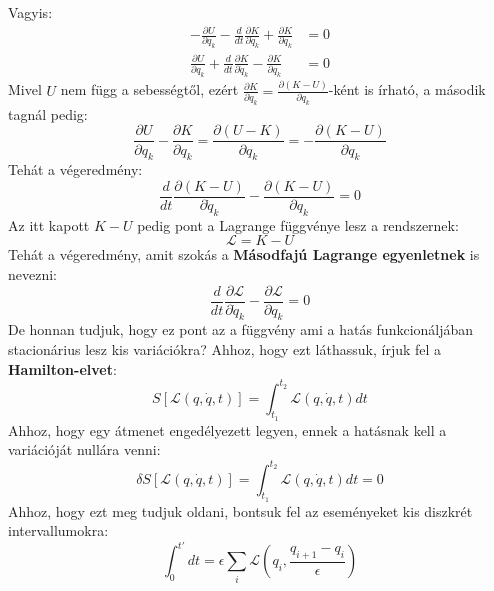\documentclass[../main.tex]{subfiles}
\begin{document}
Vagyis:
\begin{equation}
    \begin{aligned}
        - \frac{\partial U}{\partial q_k} -\frac{d}{dt} \frac{\partial K}{\partial \dot{q}_k} + \frac{\partial K}{\partial q_k} &= 0 \\
        \frac{\partial U}{\partial q_k} + \frac{d}{dt} \frac{\partial K}{\partial \dot{q}_k} - \frac{\partial K}{\partial q_k} &= 0 
    \end{aligned}
\end{equation}
Mivel $U$ nem függ a sebességtől, ezért $\frac{\partial K}{\partial \dot{q}_k} = \frac{\partial (K-U)}{\partial \dot{q}_k}$-ként is írható, a második tagnál pedig:
\begin{equation}
    \frac{\partial U}{\partial q_k} - \frac{\partial K}{\partial q_k} = \frac{\partial (U - K)}{\partial q_k} = - \frac{\partial (K - U)}{\partial q_k}
\end{equation}
Tehát a végeredmény:
\begin{equation}
    \frac{d}{dt} \frac{\partial (K - U)}{\partial \dot{q}_k} - \frac{\partial (K - U)}{\partial q_k} = 0
\end{equation}
Az itt kapott $K - U$ pedig pont a Lagrange függvénye lesz a rendszernek:
\begin{equation}
    \mathcal{L} = K - U
\end{equation}
Tehát a végeredmény, amit szokás a \textbf{Másodfajú Lagrange egyenletnek} is nevezni:
\begin{equation}
    \frac{d}{dt} \frac{\partial \mathcal{L}}{\partial \dot{q}_k} - \frac{\partial \mathcal{L}}{\partial q_k} = 0
\end{equation}
De honnan tudjuk, hogy ez pont az a függvény ami a hatás funkcionáljában stacionárius lesz kis variációkra? Ahhoz, hogy ezt láthassuk, írjuk fel a \textbf{Hamilton-elvet}:
\begin{equation}
    S[\mathcal{L}(q,\dot{q},t)] = \int_{t_1}^{t_2} \mathcal{L}(q,\dot{q},t) dt
\end{equation}
Ahhoz, hogy egy átmenet engedélyezett legyen, ennek a hatásnak kell a variációját nullára venni:
\begin{equation}
    \delta S[\mathcal{L}(q,\dot{q},t)] = \int_{t_1}^{t_2} \mathcal{L}(q,\dot{q},t) dt = 0
\end{equation}
Ahhoz, hogy ezt meg tudjuk oldani, bontsuk fel az eseményeket kis diszkrét intervallumokra:
\begin{equation}
    \int_0^{t'} dt = \epsilon \sum_i \mathcal{L}\left(q_i, \frac{q_{i+1} - q_i}{\epsilon}\right)
\end{equation}
\end{document}
